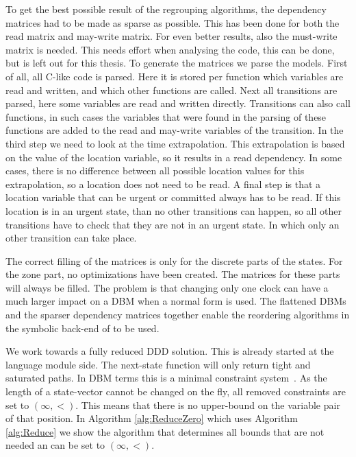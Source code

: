 \label{subsec:matrices}
To get the best possible result of the regrouping algorithms, the dependency matrices had to be made as sparse as possible. This has been done for both the read matrix and may-write matrix. For even better results, also the must-write matrix is needed. This needs effort when analysing the code, this can be done, but is left out for this thesis. To generate the matrices we parse the \uppaal{} models. First of all, all C-like code is parsed. Here it is stored per function which variables are read and written, and which other functions are called. Next all transitions are parsed, here some variables are read and written directly. Transitions can also call functions, in such cases the variables that were found in the parsing of these functions are added to the read and may-write variables of the transition. In the third step we need to look at the time extrapolation. This extrapolation is based on the value of the location variable, so it results in a read dependency. In some cases, there is no difference between all possible location values for this extrapolation, so a location does not need to be read. A final step is that a location variable that can be urgent or committed always has to be read. If this location is in an urgent state, than no other transitions can happen, so all other transitions have to check that they are not in an urgent state. In which only an other transition can take place.

The correct filling of the matrices is only for the discrete parts of the states. For the zone part, no optimizations have been created. The matrices for these parts will always be filled. The problem is that changing only one clock can have a much larger impact on a DBM when a normal form is used. The flattened DBMs and the sparser dependency matrices together enable the reordering algorithms in the symbolic back-end of \ltsmin{} to be used.

\label{subsection:dbm_reduction}
We work towards a fully reduced DDD solution. This is already started at the language module side. The next-state function will only return tight and saturated paths. In DBM terms this is a minimal constraint system~\cite{bengtsson2002clocks}. As the length of a state-vector cannot be changed on the fly, all removed constraints are set to $(\infty,<)$. This means that there is no upper-bound on the variable pair of that position. In Algorithm \ref{alg:ReduceZero} which uses Algorithm \ref{alg:Reduce} we show the algorithm that determines all bounds that are not needed an can be set to $(\infty,<)$. 

